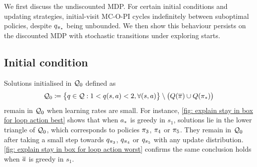 

We first discuss the undiscounted MDP.
For certain initial conditions and updating strategies, initial-visit MC-O-PI cycles indefinitely between suboptimal policies,
despite $q_{{\pi}_*}$ being unbounded. %
We then show this behaviour persists on the discounted MDP with stochastic transitions under exploring starts.

\vspace{-0.2cm}
\subsection{Initial condition}
\vspace{-0.1cm}


Solutions initialised in $\mathcal{Q}_0$ defined as
\begin{align}
\label{eq: initial cond for 3 state counter}
    \mathcal{Q}_0 
    \coloneqq 
    \big\{ 
    q \in \mathcal{Q}
    :
    1 < q(s,a) < 2 ,
    \forall (s, a)
    \big\}
    \setminus 
    \big( Q(\overline{\pi}) \cup Q({\pi}_*) \big)
\end{align}
remain in $\mathcal{Q}_0$ when learning rates are small.
For instance, \autoref{fig: explain stay in box for loop action best} shows that when ${a}_*$ is greedy in $s_1$, 
solutions lie in the lower triangle of $\mathcal{Q}_0$, which corresponds to policies $\pi_3$, $\pi_4$ or $\pi_5$.
They remain in $\mathcal{Q}_0$ after taking a small step
towards $q_{\pi_3}$, $q_{\pi_4}$ or $q_{\pi_5}$ with any update distribution.
\autoref{fig: explain stay in box for loop action worst} confirms the same conclusion holds when $\overline{a}$ is greedy in $s_1$.


